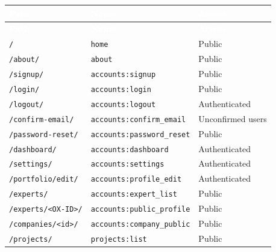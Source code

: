 \documentclass[11pt,a4paper]{article}
\renewcommand{\arraystretch}{1.25}
\newcommand{\theadcell}[1]{\textcolor{white}{\textbf{#1}}}
\newcommand{\tablehead}[1]{\rowcolor{mil900}#1}
\begin{document}
\begin{center}
\renewcommand{\arraystretch}{1.2}
\begin{longtable}{@{}L{5.8cm}L{3.2cm}L{6.4cm}@{}}
  \toprule
  \tablehead{\theadcell{Path} & \theadcell{Name} & \theadcell{Access}} \\
  \midrule
  \endfirsthead
  \toprule
  \tablehead{\theadcell{Path} & \theadcell{Name} & \theadcell{Access}} \\
  \midrule
  \endhead
  \bottomrule
  \endlastfoot
  \texttt{/\allowbreak } & \texttt{home} & Public \\
  \texttt{/\allowbreak about/\allowbreak } & \texttt{about} & Public \\
  \texttt{/\allowbreak signup/\allowbreak } & \texttt{accounts:\allowbreak signup} & Public \\
  \texttt{/\allowbreak login/\allowbreak } & \texttt{accounts:\allowbreak login} & Public \\
  \texttt{/\allowbreak logout/\allowbreak } & \texttt{accounts:\allowbreak logout} & Authenticated \\
  \texttt{/\allowbreak confirm-email/\allowbreak } & \texttt{accounts:\allowbreak confirm\_\allowbreak email} & Unconfirmed users \\
  \texttt{/\allowbreak password-reset/\allowbreak } & \texttt{accounts:\allowbreak password\_\allowbreak reset} & Public \\
  \texttt{/\allowbreak dashboard/\allowbreak } & \texttt{accounts:\allowbreak dashboard} & Authenticated \\
  \texttt{/\allowbreak settings/\allowbreak } & \texttt{accounts:\allowbreak settings} & Authenticated \\
  \texttt{/\allowbreak portfolio/\allowbreak edit/\allowbreak } & \texttt{accounts:\allowbreak profile\_\allowbreak edit} & Authenticated \\
  \texttt{/\allowbreak experts/\allowbreak } & \texttt{accounts:\allowbreak expert\_\allowbreak list} & Public \\
  \texttt{/\allowbreak experts/\allowbreak \textless OX-ID\textgreater\allowbreak /\allowbreak } & \texttt{accounts:\allowbreak public\_\allowbreak profile} & Public \\
  \texttt{/\allowbreak companies/\allowbreak \textless id\textgreater\allowbreak /\allowbreak } & \texttt{accounts:\allowbreak company\_\allowbreak public} & Public \\
  \texttt{/\allowbreak projects/\allowbreak } & \texttt{projects:\allowbreak list} & Public \\

\end{longtable}
\end{center}
\end{document}
